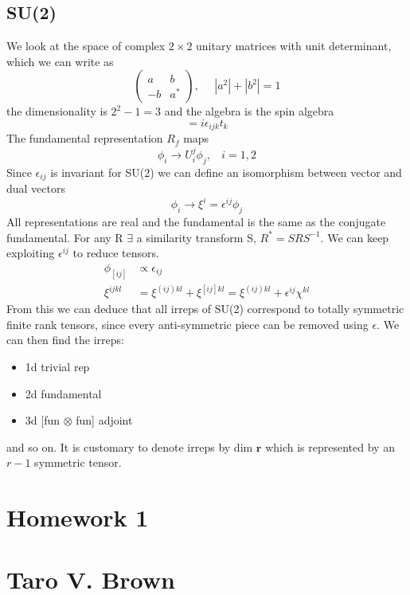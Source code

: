 \documentclass[a4paper,12pt]{article}
\begin{document}
\subsection{SU(2)}
We look at the space of complex $2\times 2$ unitary matrices with unit determinant, which we can write as
\begin{equation}
\begin{pmatrix}
a & b \\ -b & a^*
\end{pmatrix},~~~~~~|a^2|+|b^2|=1
\end{equation}
the dimensionality is $2^2-1=3$ and the algebra is the spin algebra
\begin{equation}
[t_i,t_j]=i \epsilon_{ijk}t_k
\end{equation}
The fundamental representation $R_f$ maps
\begin{equation}
\phi_i\to U_i^j \phi_j,~~~~i=1,2
\end{equation}
Since $\epsilon_{ij}$ is invariant for SU(2) we can define an isomorphism between vector and dual vectors
\begin{equation}
\phi_i\to\xi ^i=\epsilon^{ij}\phi_j
\end{equation}
All representations are real and the fundamental is the same as the conjugate fundamental. For any R $\exists$ a similarity transform S, $R^*=S R S^{-1}$.
We can keep exploiting $\epsilon^{ij}$ to reduce tensors. 
\begin{equation}
\begin{aligned}
\phi_{[ij]}&\propto \epsilon_{ij}\\
 \xi^{ijkl}&=\xi^{(ij)kl}+\xi^{[ij]kl}=\xi^{(ij)kl}+\epsilon^{ij}\chi^{kl}
\end{aligned}
\end{equation}
From this we can deduce that all irreps of SU(2) correspond to totally symmetric finite rank tensors, since every anti-symmetric piece can be removed using $\epsilon$. We can then find the irreps:
\begin{itemize}
	\item 1d trivial rep
	\item 2d fundamental
	\item 3d [fun $\otimes$ fun] adjoint 
\end{itemize}
and so on. It is customary to denote irreps by dim $\bm r$ which is represented by an $r-1$ symmetric tensor.
\newpage
\section*{Homework 1\\\\
Taro V. Brown}\vspace*{1cm}
\end{document}
